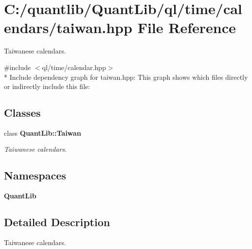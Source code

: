 \section{C\+:/quantlib/\+Quant\+Lib/ql/time/calendars/taiwan.hpp File Reference}
\label{taiwan_8hpp}


Taiwanese calendars.  


{\ttfamily \#include $<$ql/time/calendar.\+hpp$>$}\\*
Include dependency graph for taiwan.\+hpp\+:
This graph shows which files directly or indirectly include this file\+:
\subsection*{Classes}
\begin{DoxyCompactItemize}
\item 
class {\bf Quant\+Lib\+::\+Taiwan}
\begin{DoxyCompactList}\small\item\em Taiwanese calendars. \end{DoxyCompactList}\end{DoxyCompactItemize}
\subsection*{Namespaces}
\begin{DoxyCompactItemize}
\item 
 {\bf Quant\+Lib}
\end{DoxyCompactItemize}


\subsection{Detailed Description}
Taiwanese calendars. 

